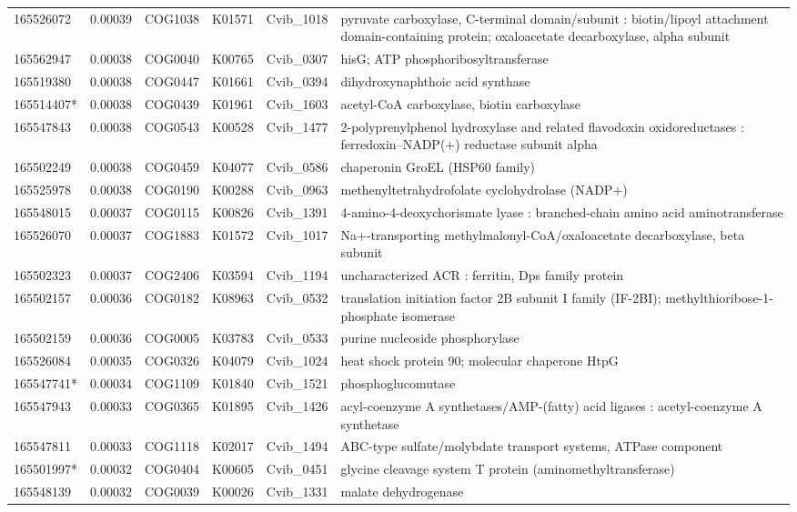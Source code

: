 \begin{landscape}
\begin{longtable}{p{1.6cm}p{1.2cm}p{1.5cm}p{1.5cm}p{2.8cm}p{13.5cm}}
165526072&0.00039&COG1038&K01571&Cvib\_1018&pyruvate carboxylase, C-terminal domain/subunit : biotin/lipoyl attachment domain-containing protein; oxaloacetate decarboxylase, alpha subunit \\
165562947&0.00038&COG0040&K00765&Cvib\_0307&hisG; ATP phosphoribosyltransferase \\
165519380&0.00038&COG0447&K01661&Cvib\_0394&dihydroxynaphthoic acid synthase \\
165514407*&0.00038&COG0439&K01961&Cvib\_1603&acetyl-CoA carboxylase, biotin carboxylase \\
165547843&0.00038&COG0543&K00528&Cvib\_1477&2-polyprenylphenol hydroxylase and related flavodoxin oxidoreductases : ferredoxin--NADP($+$) reductase subunit alpha \\
165502249&0.00038&COG0459&K04077&Cvib\_0586&chaperonin GroEL (HSP60 family) \\
165525978&0.00038&COG0190&K00288&Cvib\_0963&methenyltetrahydrofolate cyclohydrolase (NADP$+$) \\
165548015&0.00037&COG0115&K00826&Cvib\_1391&4-amino-4-deoxychorismate lyase : branched-chain amino acid aminotransferase \\
165526070&0.00037&COG1883&K01572&Cvib\_1017&Na$+$-transporting methylmalonyl-CoA/oxaloacetate decarboxylase, beta subunit \\
165502323&0.00037&COG2406&K03594&Cvib\_1194&uncharacterized ACR : ferritin, Dps family protein \\
165502157&0.00036&COG0182&K08963&Cvib\_0532&translation initiation factor 2B subunit I family (IF-2BI); methylthioribose-1-phosphate isomerase \\
165502159&0.00036&COG0005&K03783&Cvib\_0533&purine nucleoside phosphorylase \\
165526084&0.00035&COG0326&K04079&Cvib\_1024&heat shock protein 90; molecular chaperone HtpG \\
165547741*&0.00034&COG1109&K01840&Cvib\_1521&phosphoglucomutase \\
165547943&0.00033&COG0365&K01895&Cvib\_1426&acyl-coenzyme A synthetases/AMP-(fatty) acid ligases : acetyl-coenzyme A synthetase \\
165547811&0.00033&COG1118&K02017&Cvib\_1494&ABC-type sulfate/molybdate transport systems, ATPase component \\
165501997*&0.00032&COG0404&K00605&Cvib\_0451&glycine cleavage system T protein (aminomethyltransferase) \\
165548139&0.00032&COG0039&K00026&Cvib\_1331&malate dehydrogenase \\

\end{longtable}
\end{landscape}

